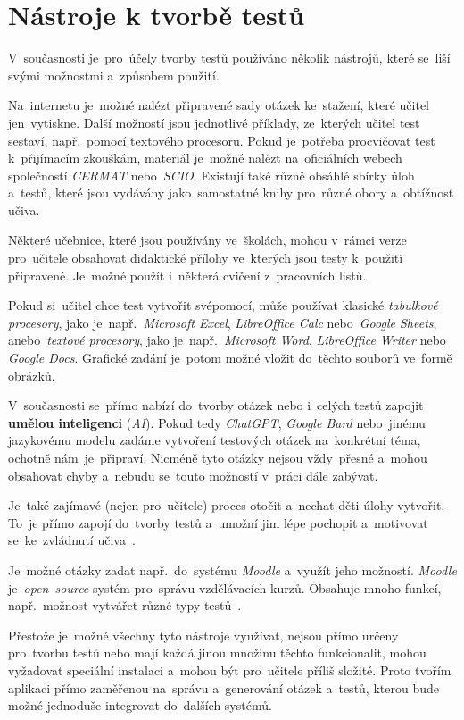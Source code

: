\documentclass[11pt,a4paper]{report}
\begin{document}
        \section{Nástroje k tvorbě testů}
            V~současnosti je~pro~účely tvorby testů používáno několik nástrojů, které se~liší svými možnostmi a~způsobem použití.
            
            Na~internetu je~možné nalézt připravené sady otázek ke~stažení, které učitel jen~vytiskne. Další možností jsou jednotlivé příklady, ze~kterých učitel test sestaví, např.~pomocí textového procesoru. Pokud je~potřeba procvičovat test k~přijímacím zkouškám, materiál je~možné nalézt na~oficiálních webech společností \emph{CERMAT} nebo~\emph{SCIO}. Existují také různě obsáhlé sbírky úloh a~testů, které jsou vydávány jako~samostatné knihy pro~různé obory a~obtížnost učiva.

            Některé učebnice, které jsou používány ve~školách, mohou v~rámci verze pro~učitele obsahovat didaktické přílohy ve~kterých jsou testy k~použití připravené. Je~možné použít i~některá cvičení z~pracovních listů.

            Pokud si~učitel chce test vytvořit svépomocí, může používat klasické \emph{tabulkové procesory}, jako je~např.~\emph{Microsoft Excel}, \emph{LibreOffice Calc} nebo~\emph{Google Sheets}, anebo~\emph{textové procesory}, jako je~např.~\emph{Microsoft Word}, \emph{LibreOffice Writer} nebo \emph{Google Docs}. Grafické zadání je~potom možné vložit do~těchto souborů ve~formě obrázků.

            V~současnosti se~přímo nabízí do~tvorby otázek nebo i~celých testů zapojit \textbf{umělou inteligenci} (\emph{AI}). Pokud tedy \emph{ChatGPT}, \emph{Google Bard} nebo~jinému jazykovému modelu zadáme vytvoření testových otázek na~konkrétní téma, ochotně nám~je~připraví. Nicméně tyto otázky nejsou vždy~přesné a~mohou obsahovat chyby a~nebudu se~touto možností v~práci dále zabývat.

            Je~také zajímavé (nejen pro~učitele) proces otočit a~nechat děti úlohy vytvořit. To~je přímo zapojí do~tvorby testů a~umožní jim lépe pochopit a~motivovat se~ke~zvládnutí učiva~\cite{hedlovam:chybavresenim}.

            Je~možné otázky zadat např.~do~systému \emph{Moodle} a~využít jeho možností. \emph{Moodle} je~\emph{open--source} systém pro~správu vzdělávacích kurzů. Obsahuje mnoho funkcí, např.~možnost vytvářet různé typy testů~\cite{drlik2013moodle}.

            Přestože je~možné všechny tyto nástroje využívat, nejsou přímo určeny pro~tvorbu testů nebo mají každá jinou množinu těchto funkcionalit, mohou vyžadovat speciální instalaci a~mohou být pro~učitele příliš složité. Proto tvořím aplikaci přímo zaměřenou na~správu a~generování otázek a~testů, kterou bude možné jednoduše integrovat do~dalších systémů.
\end{document}

